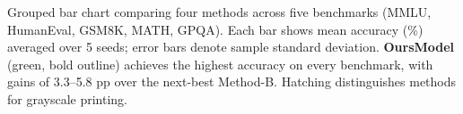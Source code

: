 \caption{Grouped bar chart comparing four methods across five benchmarks (MMLU, HumanEval, GSM8K, MATH, GPQA). Each bar shows mean accuracy (\%) averaged over 5 seeds; error bars denote sample standard deviation. \textbf{OursModel} (green, bold outline) achieves the highest accuracy on every benchmark, with gains of 3.3--5.8 pp over the next-best Method-B. Hatching distinguishes methods for grayscale printing.}
